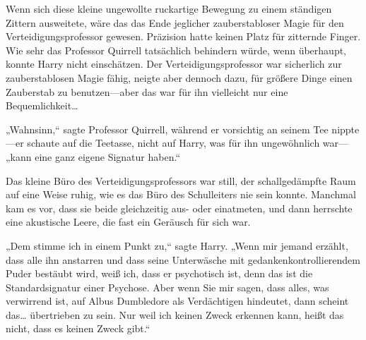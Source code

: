 Wenn sich diese kleine ungewollte ruckartige Bewegung zu einem ständigen Zittern ausweitete, wäre das das Ende jeglicher zauberstabloser Magie für den Verteidigungsprofessor gewesen. Präzision hatte keinen Platz für zitternde Finger. Wie sehr das Professor Quirrell tatsächlich behindern würde, wenn überhaupt, konnte Harry nicht einschätzen. Der Verteidigungsprofessor war sicherlich zur zauberstablosen Magie fähig, neigte aber dennoch dazu, für größere Dinge einen Zauberstab zu benutzen—aber das war für ihn vielleicht nur eine Bequemlichkeit…

„Wahnsinn,“ sagte Professor Quirrell, während er vorsichtig an seinem Tee nippte—er schaute auf die Teetasse, nicht auf Harry, was für ihn ungewöhnlich war— „kann eine ganz eigene Signatur haben.“

Das kleine Büro des Verteidigungsprofessors war still, der schallgedämpfte Raum auf eine Weise ruhig, wie es das Büro des Schulleiters nie sein konnte. Manchmal kam es vor, dass sie beide gleichzeitig aus- oder einatmeten, und dann herrschte eine akustische Leere, die fast ein Geräusch für sich war.

„Dem stimme ich in einem Punkt zu,“ sagte Harry. „Wenn mir jemand erzählt, dass alle ihn anstarren und dass seine Unterwäsche mit gedankenkontrollierendem Puder bestäubt wird, weiß ich, dass er psychotisch ist, denn das ist die Standardsignatur einer Psychose. Aber wenn Sie mir sagen, dass alles, was verwirrend ist, auf Albus Dumbledore als Verdächtigen hindeutet, dann scheint das… übertrieben zu sein. Nur weil ich keinen Zweck erkennen kann, heißt das nicht, dass es keinen Zweck gibt.“

